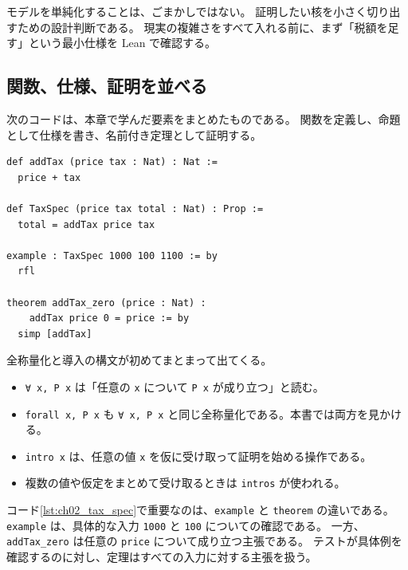 \begin{softwarebox}
モデルを単純化することは、ごまかしではない。
証明したい核を小さく切り出すための設計判断である。
現実の複雑さをすべて入れる前に、まず「税額を足す」という最小仕様を Lean で確認する。
\end{softwarebox}

\subsection{関数、仕様、証明を並べる}

次のコードは、本章で学んだ要素をまとめたものである。
関数を定義し、命題として仕様を書き、名前付き定理として証明する。

\begin{listing}[htbp]
\begin{verbatim}
def addTax (price tax : Nat) : Nat :=
  price + tax

def TaxSpec (price tax total : Nat) : Prop :=
  total = addTax price tax

example : TaxSpec 1000 100 1100 := by
  rfl

theorem addTax_zero (price : Nat) :
    addTax price 0 = price := by
  simp [addTax]
\end{verbatim}
\caption{税込金額計算の小さな仕様証明}
\label{lst:ch02_tax_spec}
\end{listing}

\begin{syntaxbox}
全称量化と導入の構文が初めてまとまって出てくる。
\begin{itemize}
\item \texttt{∀ x, P x} は「任意の \texttt{x} について \texttt{P x} が成り立つ」と読む。
\item \texttt{forall x, P x} も \texttt{∀ x, P x} と同じ全称量化である。本書では両方を見かける。
\item \texttt{intro x} は、任意の値 \texttt{x} を仮に受け取って証明を始める操作である。
\item 複数の値や仮定をまとめて受け取るときは \texttt{intros} が使われる。
\end{itemize}
\end{syntaxbox}


コード\ref{lst:ch02_tax_spec}で重要なのは、\texttt{example} と \texttt{theorem} の違いである。
\texttt{example} は、具体的な入力 \texttt{1000} と \texttt{100} についての確認である。
一方、\texttt{addTax\_zero} は任意の \texttt{price} について成り立つ主張である。
テストが具体例を確認するのに対し、定理はすべての入力に対する主張を扱う。

